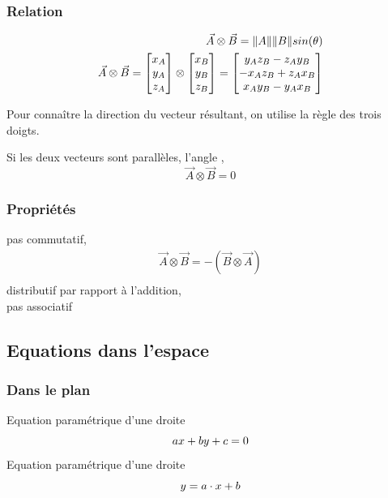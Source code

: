\subsubsection{Relation}
\begin{eqnarray}
\vec{A} \otimes \vec{B}=\lVert A\rVert \lVert B\rVert sin(\theta)\\
\vec{A} \otimes \vec{B}=
\begin{bmatrix}
x_A \\
y_A\\
z_A
\end{bmatrix}
\otimes
\begin{bmatrix}
x_B \\
y_B\\
z_B
\end{bmatrix}= 
\begin{bmatrix}
y_A z_B - z_A y_B \\
-x_A z_B + z_A x_B\\
x_A y_B - y_A x_B
\end{bmatrix}
\end{eqnarray}

Pour connaître la direction du vecteur résultant, on utilise la règle des trois doigts. 

Si les deux vecteurs sont parallèles, l'angle , 
\begin{equation}
\vec{A} \otimes \vec{B}=0
\end{equation}


\subsubsection{Propriétés}
pas commutatif,
\begin{eqnarray}
\vec{A} \otimes \vec{B}=-(\vec{B} \otimes \vec{A})\\
\end{eqnarray}
distributif par rapport à l'addition, \\

pas associatif

\subsection{Equations dans l'espace}
\subsubsection{Dans le plan}
Equation paramétrique d'une droite\\
\begin{equation}
ax+by+c=0\\
\end{equation}
Equation paramétrique d'une droite\\
\begin{equation}
y=a\cdot x+b\\
\end{equation}


